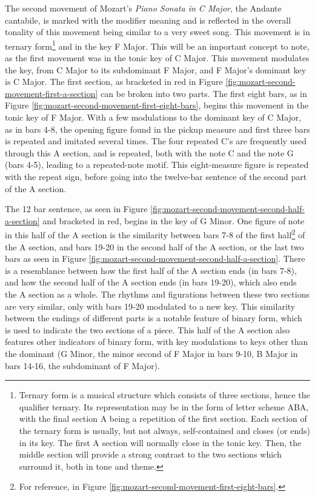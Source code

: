 The second movement of Mozart's \textit{Piano Sonata in C Major}, the Andante cantabile, is marked with the modifier  meaning  and is reflected in the overall tonality of this movement being similar to a very sweet song. This movement is in ternary form\footnote{Ternary form is a musical structure which consists of three sections, hence the qualifier ternary. Its representation may be in the form of letter scheme ABA, with the final section A being a repetition of the first section. Each section of the ternary form is usually, but not always, self-contained and closes (or ends) in its key. The first A section will normally close in the tonic key. Then, the middle section will provide a strong contrast to the two sections which surround it, both in tone and theme.} and in the key F Major. This will be an important concept to note, as the first movement was in the tonic key of C Major. This movement modulates the key, from C Major to its subdominant F Major, and F Major's dominant key is C Major. The first  section, as bracketed in red in Figure \ref{fig:mozart-second-movement-first-a-section}\autocite{Henle_1977} can be broken into two parts. The first eight bars, as in Figure \ref{fig:mozart-second-movement-first-eight-bars}\autocite{Henle_1977}, begins this movement in the tonic key of F Major. With a few modulations to the dominant key of C Major, as in bars 4-8, the opening figure found in the pickup measure and first three bars is repeated and imitated several times. The four repeated C's are frequently used through this A section, and is repeated, both with the note C and the note G (bars 4-5), leading to a repeated-note motif. This eight-measure figure is repeated with the repeat sign, before going into the twelve-bar sentence of the second part of the A section. 

The 12 bar sentence, as seen in Figure \ref{fig:mozart-second-movement-second-half-a-section}\autocite{Henle_1977} and bracketed in red, begins in the key of G Minor. One figure of note in this half of the A section is the similarity between bars 7-8 of the first half\footnote{For reference, in Figure \ref{fig:mozart-second-movement-first-eight-bars}.} of the A section, and bars 19-20 in the second half of the A section, or the last two bars as seen in Figure \ref{fig:mozart-second-movement-second-half-a-section}\autocite{Henle_1977}. There is a resemblance between how the first half of the A section ends (in bars 7-8), and how the second half of the A section ends (in bars 19-20), which also ends the A section as a whole. The rhythms and figurations between these two sections are very similar, only with bars 19-20 modulated to a new key. This similarity between the endings of different parts is a notable feature of binary form\autocite{Sutcliffe_Tilmouth_2001}, which is used to indicate the two sections of a piece. This half of the A section also features other indicators of binary form, with key modulations to keys other than the dominant (G Minor, the minor second of F Major in bars 9-10, B\musFlat{} Major in bars 14-16, the subdominant of F Major).

